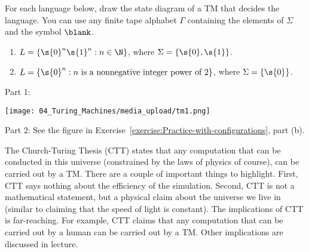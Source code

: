 \begin{flex}
\begin{exercise} \label{exercise:Drawing-TM-state-diagrams} 
For each language below, draw the state diagram of a TM that decides the language.  You can use any finite tape alphabet $\Gamma$ containing the elements of $\Sigma$ and the symbol $\blank$. 
\begin{enumerate}
    \item $L = \{\s{0}^n\s{1}^n : n \in \N\}$, where $\Sigma = \{\s{0},\s{1}\}$.
    \item $L = \{\s{0}^n : \text{$n$ is a nonnegative integer power of $2$}\}$, where $\Sigma = \{\s{0}\}$.
\end{enumerate}
\end{exercise}

\begin{solution}
Part 1:
\begin{center}
    \texttt{[image: 04\_Turing\_Machines/media\_upload/tm1.png]}
\end{center} 
\noindent
Part 2: See the figure in Exercise~\ref{exercise:Practice-with-configurations}, part (b).
\end{solution}
\end{flex}


\begin{important} \label{important:The-Church-Turing-Thesis}
The Church-Turing Thesis (CTT) states that any computation that can be conducted in this universe (constrained by the laws of physics of course), can be carried out by a TM. There are a couple of important things to highlight. First, CTT says nothing about the efficiency of the simulation. Second, CTT is not a mathematical statement, but a physical claim about the universe we live in (similar to claiming that the speed of light is constant). The implications of CTT is far-reaching. For example, CTT claims that any computation that can be carried out by a human can be carried out by a TM. Other implications are discussed in lecture.
\end{important}


